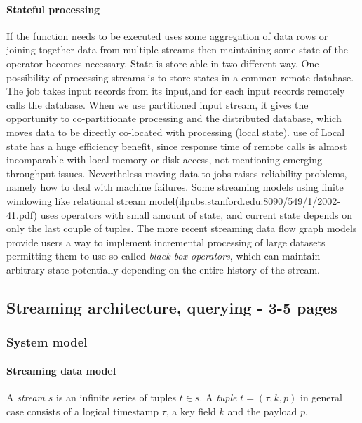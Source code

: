 \paragraph{Stateful processing}
If the function needs to be executed uses some aggregation of data rows or joining together data from multiple streams then maintaining some state of the operator becomes necessary. 
State is store-able in two different way. One possibility of processing streams is to store states in a common remote database. The job takes input records from its input,and for each input records remotely calls the database. 
When we use partitioned input stream, it gives the opportunity to co-partitionate processing and the distributed database, which moves data to be directly co-located with processing (local state).
use of Local state has a huge efficiency benefit, since response time of remote calls is almost incomparable with local memory or disk access, not mentioning emerging throughput issues.
Nevertheless moving data to jobs raises reliability problems, namely  how to deal with machine failures.\cite{localstate}
Some streaming models using finite windowing like relational stream model(ilpubs.stanford.edu:8090/549/1/2002-41.pdf) uses operators with small amount of state, and current state depends on only the last couple of tuples. The more recent streaming data flow graph models provide users a way to implement incremental processing of large datasets permitting them to use so-called \textit{black box operators}, which can maintain arbitrary state potentially depending on the entire history of the stream. \cite{pietzuch:intscaleoutandft}  


\subsection{Streaming architecture, querying -  3-5 pages}
\subsubsection{System model}
\paragraph{Streaming data model}
A \textit{stream} \begin{math}s\end{math} is an infinite series of tuples \begin{math}t\in s\end{math}. A \textit{tuple} \begin{math}t=(\tau,k,p)\end{math} in general case consists of a logical timestamp $\tau$, a key field \(k\) and the payload \(p\).

